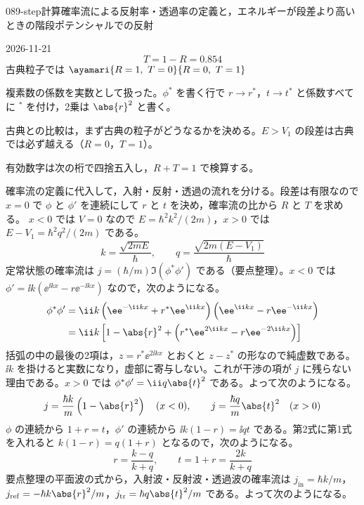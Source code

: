 \documentclass[uplatex,dvipdfmx,a4paper,11pt]{jsarticle}
\begin{document}
\begin{mondai}{089-step}{計算}{確率流による反射率・透過率の定義と，エネルギーが段差より高いときの階段ポテンシャルでの反射}
\begin{kotaeutsushi}{2026-11-21}
\[ T=1-R=0.854 \]
古典粒子では $\ayamari{R=1,\ T=0}{R=0,\ T=1}$
\end{kotaeutsushi}
\begin{kizuki}
\item {} 複素数の係数を実数として扱った。$\phi^{*}$ を書く行で $r\to r^{*}$，$t\to t^{*}$ と係数すべてに ${}^{*}$ を付け，2乗は $\abs{r}^{2}$ と書く。
\item 古典との比較は，まず古典の粒子がどうなるかを決める。$E>V_{1}$ の段差は古典では必ず越える（$R=0$，$T=1$）。
\item 有効数字は次の桁で四捨五入し，$R+T=1$ で検算する。
\end{kizuki}
\begin{tadashii}
\houshin 確率流の定義に代入して，入射・反射・透過の流れを分ける。段差は有限なので $x=0$ で $\phi$ と $\phi'$ を連続にして $r$ と $t$ を決め，確率流の比から $R$ と $T$ を求める。
\keisan
{} $x<0$ では $V=0$ なので $E=\hbar^{2}k^{2}/(2m)$，$x>0$ では $E-V_{1}=\hbar^{2}q^{2}/(2m)$ である。
\[ k=\frac{\sqrt{2mE}}{\hbar},\qquad q=\frac{\sqrt{2m(E-V_{1})}}{\hbar} \]
定常状態の確率流は $j=(\hbar/m)\Im(\phi^{*}\phi')$ である（要点整理）。$x<0$ では $\phi'=\ii k(\ee^{\ii kx}-r\ee^{-\ii kx})$ なので，次のようになる。
\begin{align*}
\phi^{*}\phi'&=\ii k\left(\ee^{-\ii kx}+r^{*}\ee^{\ii kx}\right)\left(\ee^{\ii kx}-r\ee^{-\ii kx}\right)\\
&=\ii k\left[1-\abs{r}^{2}+\left(r^{*}\ee^{2\ii kx}-r\ee^{-2\ii kx}\right)\right]
\end{align*}
括弧の中の最後の2項は，$z=r^{*}\ee^{2\ii kx}$ とおくと $z-z^{*}$ の形なので純虚数である。$\ii k$ を掛けると実数になり，虚部に寄与しない。これが干渉の項が $j$ に残らない理由である。$x>0$ では $\phi^{*}\phi'=\ii q\abs{t}^{2}$ である。よって次のようになる。
\[ j=\frac{\hbar k}{m}\left(1-\abs{r}^{2}\right)\quad(x<0),\qquad j=\frac{\hbar q}{m}\abs{t}^{2}\quad(x>0) \]
 $\phi$ の連続から $1+r=t$，$\phi'$ の連続から $\ii k(1-r)=\ii qt$ である。第2式に第1式を入れると $k(1-r)=q(1+r)$ となるので，次のようになる。
\[ r=\frac{k-q}{k+q},\qquad t=1+r=\frac{2k}{k+q} \]
 要点整理の平面波の式から，入射波・反射波・透過波の確率流は $j_{\mathrm{in}}=\hbar k/m$，$j_{\mathrm{ref}}=-\hbar k\abs{r}^{2}/m$，$j_{\mathrm{tr}}=\hbar q\abs{t}^{2}/m$ である。よって次のようになる。

\end{tadashii}
\end{mondai}
\end{document}
